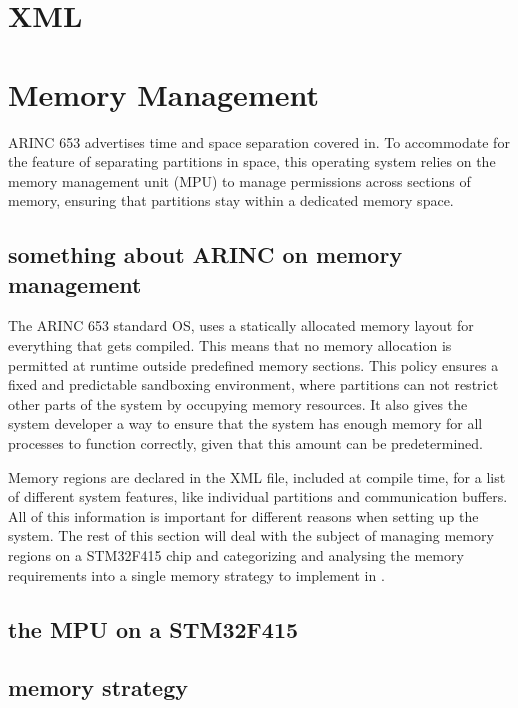 \section{XML}


\section{Memory Management}
ARINC 653 advertises time and space separation covered in.
To accommodate for the feature of separating partitions in space,
this operating system relies on the memory management unit (MPU)
to manage permissions across sections of memory,
ensuring that partitions stay within a dedicated memory space.

\subsection{something about ARINC on memory management}
The ARINC 653 standard OS, uses a statically allocated memory layout for everything
that gets compiled.
This means that no memory allocation is permitted at runtime
outside predefined memory sections.
This policy ensures a fixed and predictable sandboxing environment, where partitions
can not restrict other parts of the system by occupying memory resources.
It also gives the system developer a way to ensure that the system has enough memory
for all processes to function correctly, given that this amount can be predetermined.

Memory regions are declared in the XML file, included at compile time, for a list
of different system features, like individual partitions and communication buffers.
All of this information is important for different reasons when setting up the system.
The rest of this section will deal with the subject of managing memory regions on a STM32F415 chip
and categorizing and analysing the memory requirements into a single memory strategy to implement in
.

\subsection{the MPU on a STM32F415}

\subsection{memory strategy}

